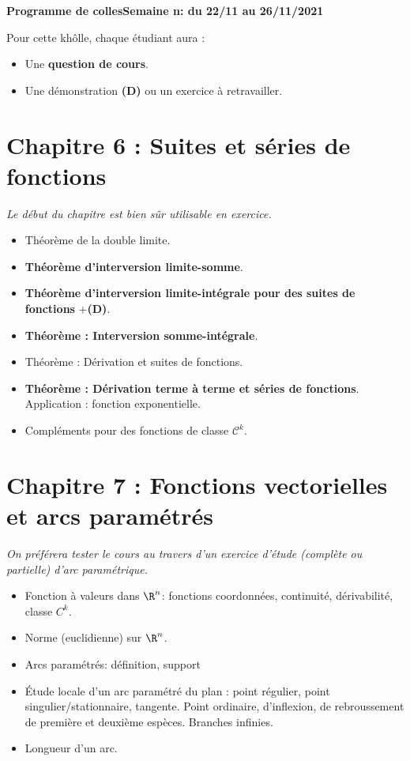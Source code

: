 \documentclass[twoside,a4paper,french,10pt]{VcCours}
\begin{document}

\begin{center}
\large\bf
Programme de collesSemaine n: du 22/11 au 26/11/2021
\end{center}
\separationTitre


Pour cette khôlle, chaque étudiant aura :
\begin{itemize}
\item Une \textbf{question de cours}.
\item Une démonstration \textbf{(D)} ou un exercice à retravailler.
\end{itemize}



\section*{Chapitre 6 : Suites et séries de fonctions}

\emph{Le début du chapitre est bien sûr utilisable en exercice.}
\begin{itemize}
\item Théorème de la double limite.
\item \textbf{Théorème d'interversion limite-somme}.
\item \textbf{Théorème d'interversion limite-intégrale pour des suites de fonctions} +\textbf{(D)}.
\item \textbf{Théorème : Interversion somme-intégrale}.
\item Théorème : Dérivation et suites de fonctions.
\item \textbf{Théorème : Dérivation terme à terme et séries de fonctions}. Application : fonction exponentielle.
\item Compléments pour des fonctions de classe $\mathcal{C}^k$.
\end{itemize}

\section*{Chapitre 7 : Fonctions vectorielles et arcs paramétrés}
\emph{On préférera tester le cours au travers d'un exercice d'étude (complète ou partielle) d'arc paramétrique.}

\begin{itemize}
    \item Fonction à valeurs dans $\R^n$: fonctions coordonnées, continuité, dérivabilité, classe $C^k$.
    \item Norme (euclidienne) sur $\R^n$.
    \item Arcs paramétrés: définition, support
    \item Étude locale d’un arc paramétré du plan : point régulier, point 
    singulier/stationnaire, tangente. Point ordinaire, d'inflexion, de 
    rebroussement de première et deuxième espèces. Branches infinies.
    \item Longueur d’un arc.
\end{itemize} 
\end{document}
